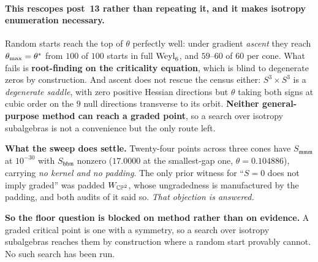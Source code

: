 \paragraph{This rescopes post~13 rather than repeating it, and it makes isotropy enumeration necessary.} Random starts reach the top of $\theta$ perfectly well: under gradient \emph{ascent} they reach $\theta_{\max}=\theta^{*}$ from $100$ of $100$ starts in full $\mathrm{Weyl}_6$, and $59$--$60$ of $60$ per cone. What fails is \textbf{root-finding on the criticality equation}, which is blind to degenerate zeros by construction. And ascent does not rescue the census either: $S^3\times S^3$ is a \emph{degenerate saddle}, with zero positive Hessian directions but $\theta$ taking both signs at cubic order on the $9$ null directions transverse to its orbit. \textbf{Neither general-purpose method can reach a graded point}, so a search over isotropy subalgebras is not a convenience but the only route left.

\textbf{What the sweep does settle.} Twenty-four points across three cones have $S_{\mathfrak{mmm}}$ at $10^{-30}$ with $S_{\mathfrak{hhm}}$ nonzero ($17.0000$ at the smallest-gap one, $\theta=0.104886$), carrying \emph{no kernel and no padding}. The only prior witness for ``$S=0$ does not imply graded'' was padded $W_{\mathbb{CP}^2}$, whose ungradedness is manufactured by the padding, and both audits of it said so. \emph{That objection is answered.}

\textbf{So the floor question is blocked on method rather than on evidence.} A graded critical point is one with a symmetry, so a search over isotropy subalgebras reaches them by construction where a random start provably cannot. No such search has been run.

